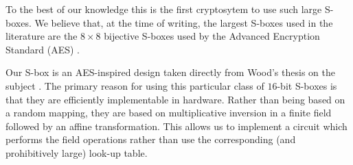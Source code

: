 To the best of our knowledge this is the first cryptosytem to use such large S-boxes.
We believe that, at the time of writing, the largest S-boxes used in the literature are the $8 \times 8$ bijective S-boxes used by the Advanced Encryption Standard (AES) \cite{Daemen2002_DesignOfRijndael}\cite{NIST2001_FIPS-197}.

Our S-box is an AES-inspired design taken directly from Wood's thesis on the subject \cite{Wood2013_SboxThesis}.
The primary reason for using this particular class of $16$-bit S-boxes is that they are efficiently implementable in hardware.
Rather than being based on a random mapping, they are based on multiplicative inversion in a finite field followed by an affine transformation.
This allows us to implement a circuit which performs the field operations rather than use the corresponding (and prohibitively large) look-up table.

